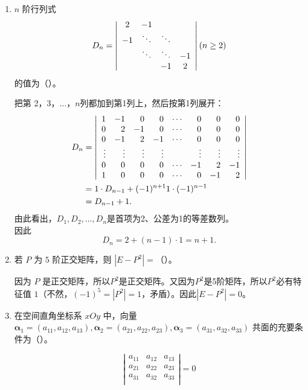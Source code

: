 \begin{enumerate}[1~]
\begin{enumerate}[1.~]
\item
$n$ 阶行列式 
$$
D _ { n } = \left| \begin{array} { c c c c } { 2 } & { - 1 } & { } & { } \\ { - 1 } & { \ddots } & { \ddots } & { } \\ { } & { \ddots } & { \ddots } & { - 1 } \\ { } & { } & { - 1 } & { 2 } \end{array} \right| ( n \geq 2 )
$$
的值为（\quad）。
\begin{solution}
把第 2，3，$\dots$，$n$列都加到第1列上，然后按第1列展开：
\begin{align*}
D _ { n } &= \left| \begin{array} { r r r r r r r r } { 1 } & { - 1 } & { 0 } & { 0 } & { \cdots } & { 0 } & { 0 } & { 0 } \\ { 0 } & { 2 } & { - 1 } & { 0 } & { \cdots } & { 0 } & { 0 } & { 0 } \\ { 0 } & { - 1 } & { 2 } & { - 1 } & { \cdots } & { 0 } & { 0 } & { 0 } \\ { \vdots } & { \vdots } & { \vdots } & { \vdots } & { } & { \vdots } & { \vdots } & { \vdots } \\ { 0 } & { 0 } & { 0 } & { 0 } & { \cdots } & { - 1 } & { 2 } & { - 1 } \\ { 1 } & { 0 } & { 0 } & { 0 } & { \cdots } & { 0 } & { - 1 } & { 2 } \end{array} \right|\\
&=1 \cdot D _ { n - 1 } + ( - 1 ) ^ { n + 1 } 1 \cdot ( - 1 ) ^ { n - 1 }\\
&=D_{n-1}+1.
\end{align*}
由此看出，$D _ { 1 } , D _ { 2 } , \dots , D _ { n }$是首项为2、公差为1的等差数列。\\
因此\[
D _ { n } = 2 + ( n - 1 ) \cdot 1 = n + 1 .
\]
\end{solution}

\item
若 $P$ 为 $5$ 阶正交矩阵，则 $|E - P^2|=$（\quad）。
\begin{solution}
因为 $P$ 是正交矩阵，所以$P^2$是正交矩阵。又因为$P^2$是5阶矩阵，所以$P^2$必有特征值 $1$（不然，$(-1)^5=|P^2|=1$，矛盾）。因此$|E-P^2|=0$。
\end{solution}

\item
在空间直角坐标系 $xOy$ 中，向量 $\boldsymbol{\boldsymbol{\alpha}} _ { 1 } = \left( a _ { 11 } , a _ { 12 } , a _ { 13 } \right) ,  \boldsymbol{\boldsymbol{\alpha}} _ { 2 } = \left( a _ { 21 } , a _ { 22 } , a _ { 23 } \right) ,  \boldsymbol{\boldsymbol{\alpha}} _ { 3 } = \left( a _ { 31 } , a _ { 32 } , a _ { 33 } \right)$ 共面的充要条件为（\quad）。
\begin{solution}
$$
\left| \begin{matrix}
	a_{11}&		a_{12}&		a_{13}\\
	a_{21}&		a_{22}&		a_{23}\\
	a_{31}&		a_{32}&		a_{33}\\
\end{matrix} \right|=0$$
\end{solution}


\end{enumerate}
\end{enumerate}
